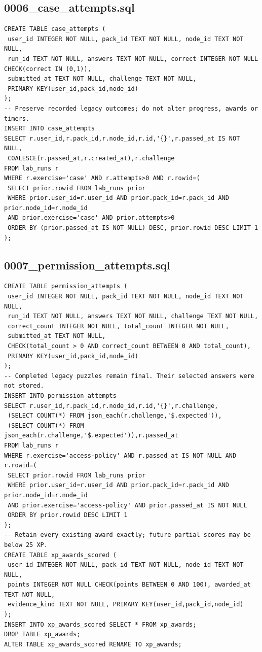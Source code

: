 \subsection{0006\_case\_attempts.sql}
\begin{verbatim}
CREATE TABLE case_attempts (
 user_id INTEGER NOT NULL, pack_id TEXT NOT NULL, node_id TEXT NOT NULL,
 run_id TEXT NOT NULL, answers TEXT NOT NULL, correct INTEGER NOT NULL CHECK(correct IN (0,1)),
 submitted_at TEXT NOT NULL, challenge TEXT NOT NULL,
 PRIMARY KEY(user_id,pack_id,node_id)
);
-- Preserve recorded legacy outcomes; do not alter progress, awards or timers.
INSERT INTO case_attempts
SELECT r.user_id,r.pack_id,r.node_id,r.id,'{}',r.passed_at IS NOT NULL,
 COALESCE(r.passed_at,r.created_at),r.challenge
FROM lab_runs r
WHERE r.exercise='case' AND r.attempts>0 AND r.rowid=(
 SELECT prior.rowid FROM lab_runs prior
 WHERE prior.user_id=r.user_id AND prior.pack_id=r.pack_id AND prior.node_id=r.node_id
 AND prior.exercise='case' AND prior.attempts>0
 ORDER BY (prior.passed_at IS NOT NULL) DESC, prior.rowid DESC LIMIT 1
);
\end{verbatim}
\subsection{0007\_permission\_attempts.sql}
\begin{verbatim}
CREATE TABLE permission_attempts (
 user_id INTEGER NOT NULL, pack_id TEXT NOT NULL, node_id TEXT NOT NULL,
 run_id TEXT NOT NULL, answers TEXT NOT NULL, challenge TEXT NOT NULL,
 correct_count INTEGER NOT NULL, total_count INTEGER NOT NULL,
 submitted_at TEXT NOT NULL,
 CHECK(total_count > 0 AND correct_count BETWEEN 0 AND total_count),
 PRIMARY KEY(user_id,pack_id,node_id)
);
-- Completed legacy puzzles remain final. Their selected answers were not stored.
INSERT INTO permission_attempts
SELECT r.user_id,r.pack_id,r.node_id,r.id,'{}',r.challenge,
 (SELECT COUNT(*) FROM json_each(r.challenge,'$.expected')),
 (SELECT COUNT(*) FROM json_each(r.challenge,'$.expected')),r.passed_at
FROM lab_runs r
WHERE r.exercise='access-policy' AND r.passed_at IS NOT NULL AND r.rowid=(
 SELECT prior.rowid FROM lab_runs prior
 WHERE prior.user_id=r.user_id AND prior.pack_id=r.pack_id AND prior.node_id=r.node_id
 AND prior.exercise='access-policy' AND prior.passed_at IS NOT NULL
 ORDER BY prior.rowid DESC LIMIT 1
);
-- Retain every existing award exactly; future partial scores may be below 25 XP.
CREATE TABLE xp_awards_scored (
 user_id INTEGER NOT NULL, pack_id TEXT NOT NULL, node_id TEXT NOT NULL,
 points INTEGER NOT NULL CHECK(points BETWEEN 0 AND 100), awarded_at TEXT NOT NULL,
 evidence_kind TEXT NOT NULL, PRIMARY KEY(user_id,pack_id,node_id)
);
INSERT INTO xp_awards_scored SELECT * FROM xp_awards;
DROP TABLE xp_awards;
ALTER TABLE xp_awards_scored RENAME TO xp_awards;
\end{verbatim}
